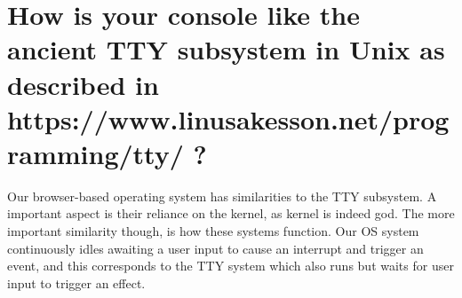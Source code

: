 \documentclass[letterpaper, 10pt,DIV=13]{scrartcl}
\numberwithin{equation}{section} %
\numberwithin{figure}{section} %
\numberwithin{table}{section} %
\begin{document}
\section{How is your console like the ancient TTY subsystem in Unix as described in 
https://www.linusakesson.net/programming/tty/ ?}

Our browser-based operating system has similarities to the TTY subsystem. A important aspect is their reliance on the kernel, as kernel is indeed god. The more important similarity though, is how these systems function. Our OS system continuously idles awaiting a user input to cause an interrupt and trigger an event, and this corresponds to the TTY system which also runs but waits for user input to trigger an effect.


 
\end{document}
